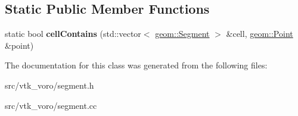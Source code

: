 \subsection*{Static Public Member Functions}
\begin{DoxyCompactItemize}
\item 
static bool {\bfseries cell\+Contains} (std\+::vector$<$ \hyperlink{classgeom_1_1Segment}{geom\+::\+Segment} $>$ \&cell, \hyperlink{classgeom_1_1Point}{geom\+::\+Point} \&point)\hypertarget{classgeom_1_1Segment_a381b9f330c4fadddea9a015d319b9d7c}{}\label{classgeom_1_1Segment_a381b9f330c4fadddea9a015d319b9d7c}

\end{DoxyCompactItemize}


The documentation for this class was generated from the following files\+:\begin{DoxyCompactItemize}
\item 
src/vtk\+\_\+voro/segment.\+h\item 
src/vtk\+\_\+voro/segment.\+cc\end{DoxyCompactItemize}
